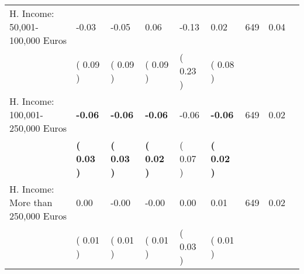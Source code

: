 \begin{tabular}{L{6.2cm} C{1.8cm} C{1.8cm} C{1.8cm} C{1.8cm} C{1.8cm} C{1.8cm} C{0.3cm} C{0.3cm}}
H. Income: 50,001-100,000 Euros &     -0.03 &     -0.05 &      0.06 &     -0.13 &      0.02  & 649 &       0.04 \\ 
 & (     0.09 ) & (     0.09 ) & (     0.09 ) & (     0.23 ) & (     0.08 )  & \\
H. Income: 100,001-250,000 Euros & \textbf{    -0.06} & \textbf{    -0.06} & \textbf{    -0.06} &     -0.06 & \textbf{    -0.06}  & 649 &       0.02 \\ 
 & \textbf{(     0.03 )} & \textbf{(     0.03 )} & \textbf{(     0.02 )} & (     0.07 ) & \textbf{(     0.02 )}  & \\
H. Income: More than 250,000 Euros &      0.00 &     -0.00 &     -0.00 &      0.00 &      0.01  & 649 &       0.02 \\ 
 & (     0.01 ) & (     0.01 ) & (     0.01 ) & (     0.03 ) & (     0.01 )  & \\
\bottomrule
\end{tabular}
